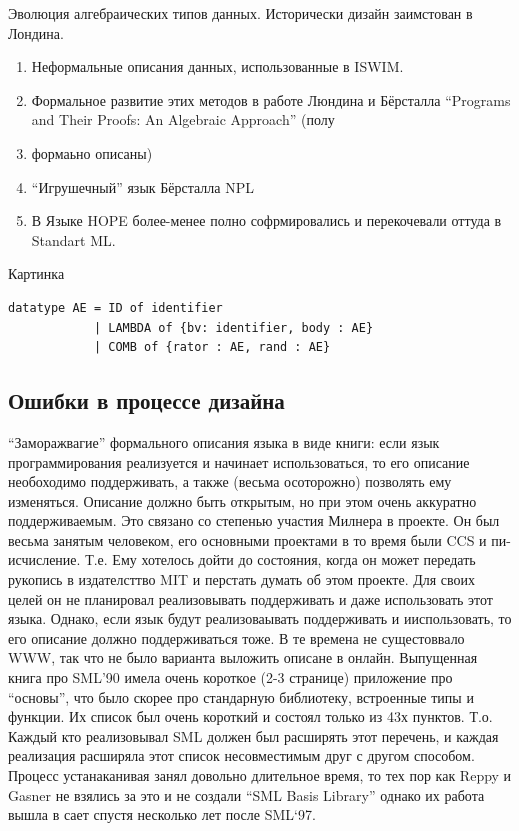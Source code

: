 \documentclass[14pt]{matmex-diploma-custom}
\begin{document}
Эволюция алгебраических типов данных.
Исторически дизайн заимстован в Лондина. 
\begin{enumerate}
\item Неформальные описания данных, использованные в ISWIM.
\item Формальное развитие этих методов в работе Люндина и Бёрсталла “Programs and Their Proofs: An Algebraic Approach” (полу \item формаьно описаны)
\item “Игрушечный” язык Бёрсталла NPL
\item В Языке HOPE более-менее полно софрмировались и перекочевали оттуда в Standart ML.
\end{enumerate}



Картинка
\begin{verbatim}
datatype AE = ID of identifier
            | LAMBDA of {bv: identifier, body : AE}
            | COMB of {rator : AE, rand : AE}
\end{verbatim}

\subsection{Ошибки в процессе дизайна}
“Заморажвагие” формального описания языка в виде книги: если язык программирования реализуется и начинает использоваться, то его описание необоходимо поддерживать, а также (весьма осоторожно) позволять ему изменяться. Описание должно быть открытым, но при этом очень аккуратно поддерживаемым.
Это связано со степенью участия Милнера в проекте. Он был весьма занятым человеком, его основными проектами в то время были CCS и пи-исчисление. Т.е. Ему хотелось дойти до состояния, когда он может передать рукопись в издателсттво MIT  и перстать думать об этом проекте. Для своих целей он не планировал реализовывать поддерживать и даже использовать этот языка. Однако, если язык будут реализоваывать поддерживать и ииспользовать, то его описание должно поддерживаться тоже. В те времена не сущестоввало WWW, так что не было варианта выложить описане в онлайн.
Выпущенная книга про SML’90 имела очень короткое (2-3 странице) приложение про “основы”, что было скорее про стандарную библиотеку, встроенные типы и функции. Их список был очень короткий и состоял только из 43х пунктов. Т.о. Каждый кто реализовывал SML должен был расширять этот перечень, и каждая реализация расширяла этот список несовместимым друг с другом способом. Процесс устанаканивая занял довольно длительное время, то тех пор как Reppy и Gasner не взялись  за это и не создали “SML Basis Library” однако их работа вышла в сает спустя несколько лет после SML‘97.
\end{document}
